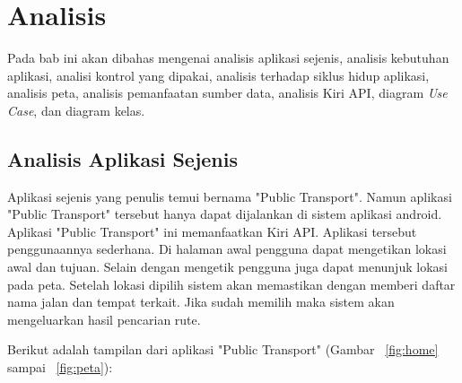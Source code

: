 \chapter{Analisis}
\label{chap:analisi}

Pada bab ini akan dibahas mengenai analisis aplikasi sejenis, analisis kebutuhan aplikasi, analisi kontrol yang dipakai, analisis terhadap siklus hidup aplikasi, analisis peta, analisis pemanfaatan sumber data, analisis Kiri API, diagram \textit{Use Case}, dan diagram kelas.

\section{Analisis Aplikasi Sejenis}
\label{lab:Analisis Aplikasi Sejenis}
\hspace{0.5cm} Aplikasi sejenis yang penulis temui bernama "Public Transport"\footnotemark[1]. Namun aplikasi "Public Transport" tersebut hanya dapat dijalankan di sistem aplikasi android. Aplikasi "Public Transport" ini memanfaatkan Kiri API. Aplikasi tersebut penggunaannya sederhana. Di halaman awal pengguna dapat mengetikan lokasi awal dan tujuan. Selain dengan mengetik pengguna juga dapat menunjuk lokasi pada peta. Setelah lokasi dipilih sistem akan memastikan dengan memberi daftar nama jalan dan tempat terkait. Jika sudah memilih maka sistem akan mengeluarkan hasil pencarian rute.

Berikut adalah tampilan dari aplikasi "Public Transport" (Gambar ~\ref{fig:home} sampai ~\ref{fig:peta}):

